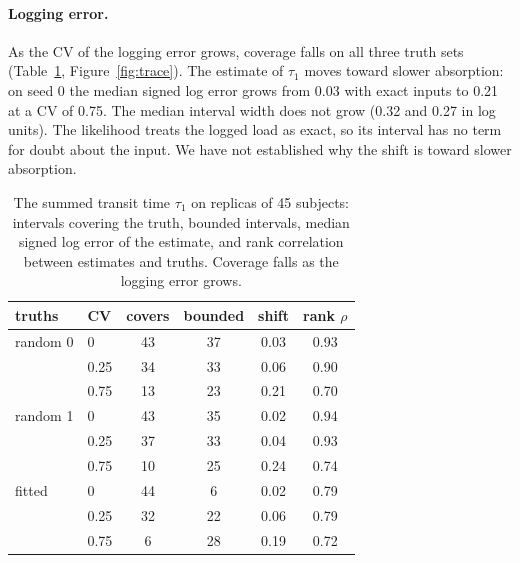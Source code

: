 \documentclass[letterpaper]{article} %
\newcommand{\wsFitQuarterBounded}{22}
\newcommand{\wsFitQuarterCover}{32}
\newcommand{\wsFitQuarterRho}{0.79}
\newcommand{\wsFitQuarterShift}{0.06}
\newcommand{\wsFitThreeQuarterBounded}{28}
\newcommand{\wsFitThreeQuarterCover}{6}
\newcommand{\wsFitThreeQuarterRho}{0.72}
\newcommand{\wsFitThreeQuarterShift}{0.19}
\newcommand{\wsFitZeroBounded}{6}
\newcommand{\wsFitZeroCover}{44}
\newcommand{\wsFitZeroRho}{0.79}
\newcommand{\wsFitZeroShift}{0.02}
\newcommand{\wsN}{45}
\newcommand{\wsRandAQuarterBounded}{33}
\newcommand{\wsRandAQuarterCover}{34}
\newcommand{\wsRandAQuarterRho}{0.90}
\newcommand{\wsRandAQuarterShift}{0.06}
\newcommand{\wsRandAThreeQuarterBounded}{23}
\newcommand{\wsRandAThreeQuarterCover}{13}
\newcommand{\wsRandAThreeQuarterRho}{0.70}
\newcommand{\wsRandAThreeQuarterShift}{0.21}
\newcommand{\wsRandAThreeQuarterWidth}{0.27}
\newcommand{\wsRandAZeroBounded}{37}
\newcommand{\wsRandAZeroCover}{43}
\newcommand{\wsRandAZeroRho}{0.93}
\newcommand{\wsRandAZeroShift}{0.03}
\newcommand{\wsRandAZeroWidth}{0.32}
\newcommand{\wsRandBQuarterBounded}{33}
\newcommand{\wsRandBQuarterCover}{37}
\newcommand{\wsRandBQuarterRho}{0.93}
\newcommand{\wsRandBQuarterShift}{0.04}
\newcommand{\wsRandBThreeQuarterBounded}{25}
\newcommand{\wsRandBThreeQuarterCover}{10}
\newcommand{\wsRandBThreeQuarterRho}{0.74}
\newcommand{\wsRandBThreeQuarterShift}{0.24}
\newcommand{\wsRandBZeroBounded}{35}
\newcommand{\wsRandBZeroCover}{43}
\newcommand{\wsRandBZeroRho}{0.94}
\newcommand{\wsRandBZeroShift}{0.02}
\begin{document}
\paragraph{Logging error.} As the CV of the logging error grows, coverage falls on all three truth sets (Table~\ref{tab:sweep}, Figure~\ref{fig:trace}). The estimate of $\tau_1$ moves toward slower absorption: on seed 0 the median signed log error grows from \wsRandAZeroShift{} with exact inputs to \wsRandAThreeQuarterShift{} at a CV of 0.75. The median interval width does not grow (\wsRandAZeroWidth{} and \wsRandAThreeQuarterWidth{} in log units). The likelihood treats the logged load as exact, so its interval has no term for doubt about the input. We have not established why the shift is toward slower absorption.

\begin{table}[t]
\centering
\small
\begin{tabular}{llcccc}
\toprule
truths & CV & covers & bounded & shift & rank $\rho$ \\
\midrule
random 0 & 0 & \wsRandAZeroCover & \wsRandAZeroBounded & \wsRandAZeroShift & \wsRandAZeroRho \\
 & 0.25 & \wsRandAQuarterCover & \wsRandAQuarterBounded & \wsRandAQuarterShift & \wsRandAQuarterRho \\
 & 0.75 & \wsRandAThreeQuarterCover & \wsRandAThreeQuarterBounded & \wsRandAThreeQuarterShift & \wsRandAThreeQuarterRho \\
random 1 & 0 & \wsRandBZeroCover & \wsRandBZeroBounded & \wsRandBZeroShift & \wsRandBZeroRho \\
 & 0.25 & \wsRandBQuarterCover & \wsRandBQuarterBounded & \wsRandBQuarterShift & \wsRandBQuarterRho \\
 & 0.75 & \wsRandBThreeQuarterCover & \wsRandBThreeQuarterBounded & \wsRandBThreeQuarterShift & \wsRandBThreeQuarterRho \\
fitted & 0 & \wsFitZeroCover & \wsFitZeroBounded & \wsFitZeroShift & \wsFitZeroRho \\
 & 0.25 & \wsFitQuarterCover & \wsFitQuarterBounded & \wsFitQuarterShift & \wsFitQuarterRho \\
 & 0.75 & \wsFitThreeQuarterCover & \wsFitThreeQuarterBounded & \wsFitThreeQuarterShift & \wsFitThreeQuarterRho \\
\bottomrule
\end{tabular}
\caption{The summed transit time $\tau_1$ on replicas of \wsN{} subjects: intervals covering the truth, bounded intervals, median signed log error of the estimate, and rank correlation between estimates and truths. Coverage falls as the logging error grows.}
\label{tab:sweep}
\end{table}
\end{document}
